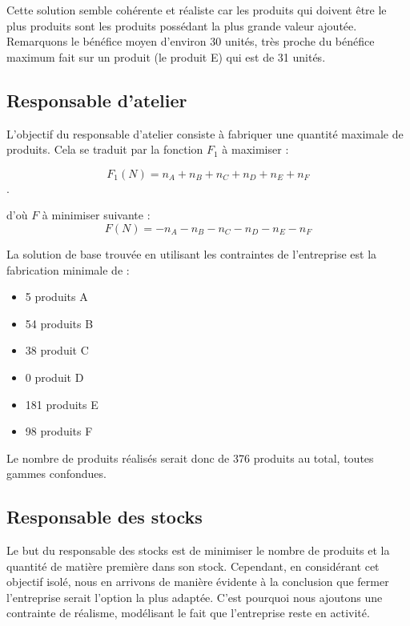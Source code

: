 \documentclass[a4paper,10pt]{article}
\begin{document}
Cette solution semble cohérente et réaliste car les produits qui doivent être le plus produits sont les produits possédant la plus grande valeur ajoutée. Remarquons le bénéfice moyen d'environ 30 unités, très proche du bénéfice maximum fait sur un produit (le produit E) qui est de 31 unités.


\subsection{Responsable d'atelier}

L'objectif du responsable d'atelier consiste à fabriquer une quantité maximale de produits. Cela se traduit par la fonction $F_1$ à maximiser :

$$F_1(N) = n_A + n_B + n_C + n_D + n_E + n_F$$.

d'où $F$ à minimiser suivante :
$$F(N) = - n_A - n_B - n_C - n_D - n_E - n_F$$

La solution de base trouvée en utilisant les contraintes de l'entreprise est la fabrication minimale de :\newline
\begin{itemize}
\item[\textbullet] 5 produits A
\item[\textbullet] 54 produits B
\item[\textbullet] 38 produit C
\item[\textbullet] 0 produit D
\item[\textbullet] 181 produits E
\item[\textbullet] 98 produits F\newline
\end{itemize}
Le nombre de produits réalisés serait donc de 376 produits au total, toutes gammes confondues.


\subsection{Responsable des stocks}

Le but du responsable des stocks est de minimiser le nombre de produits et la quantité de matière première dans son stock. Cependant, en considérant cet objectif isolé, nous en arrivons de manière évidente à la conclusion que fermer l'entreprise serait l'option la plus adaptée. C'est pourquoi nous ajoutons une contrainte de réalisme, modélisant le fait que l'entreprise reste en activité.\newline
\end{document}
